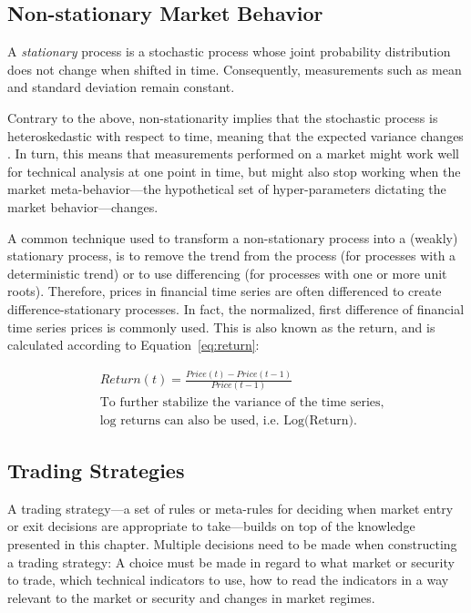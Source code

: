 \begin{multicols}{2}
\subsection{Non-stationary Market Behavior}

A \textit{stationary} process is a stochastic process whose joint probability
distribution does not change when shifted in time.  Consequently, measurements
such as mean and standard deviation remain constant.

Contrary to the above, non-stationarity implies that the stochastic process is
heteroskedastic with respect to time, meaning that the expected variance changes
\citep{tunnicliffe1989non}.  In turn, this means that measurements performed on
a market might work well for technical analysis at one point in time, but might
also stop working when the market meta-behavior---the hypothetical set of
hyper-parameters dictating the market behavior---changes.

A common technique used to transform a non-stationary process into a (weakly)
stationary process, is to remove the trend from the process (for processes with
a deterministic trend) or to use differencing (for processes with one or more
unit roots).  Therefore, prices in financial time series are often differenced to
create difference-stationary processes.  In fact, the normalized, first
difference of financial time series prices is commonly used. This is also known
as the return, and is calculated according to Equation~\ref{eq:return}:

\begin{Figure}
  \begin{align*}
    & Return(t) = \frac{Price(t)-Price(t-1)}{Price(t-1)} \\
    & \text{To further stabilize the variance of the time series,} \\
    & \text{log returns can also be used, i.e.\ Log(Return).}
  \end{align*}
\label{eq:return}
\end{Figure}

\subsection{Trading Strategies}

A trading strategy---a set of rules or meta-rules for deciding when market entry
or exit decisions are appropriate to take---builds on top of the knowledge
presented in this chapter.  Multiple decisions need to be made when constructing
a trading strategy: A choice must be made in regard to what market or security
to trade, which technical indicators to use, how to read the indicators in a way
relevant to the market or security and changes in market regimes.


\end{multicols}
